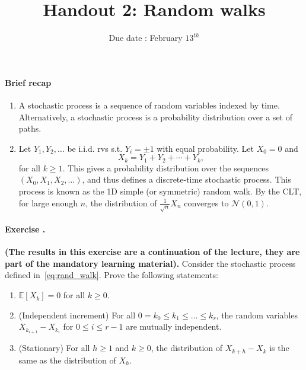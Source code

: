 \documentclass[twocolumn,12pt,a4paper]{article}
\title{ \bfseries \Huge {Handout 2: Random walks }}
\date{Due date : February $13^{th}$}
\newcommand{\calN}{\mathcal N}
\newcounter{num}  %
\begin{document}
	\maketitle
	\setcounter{num}{1}  %
	
	\thispagestyle{empty} 
	\paragraph{Brief recap}
	\begin{enumerate}
		\item A stochastic process is a sequence of random variables indexed by time.
		Alternatively, a stochastic process is a probability distribution over a set of paths.
	\item 	Let \( Y_1, Y_2, \dots \) be i.i.d. rvs s.t. \( Y_i = \pm 1 \) with equal probability. Let \( X_0 = 0 \) and
	\begin{equation}\label{eq:rand_walk}
		X_k = Y_1 + Y_2 + \cdots + Y_k,
	\end{equation}
	for all \( k \geq 1 \). This gives a probability distribution over the sequences $( X_0, X_1, X_2, \dots)$, and thus defines a discrete-time stochastic process. This process is known as the 1D simple (or symmetric) random walk.
	By the CLT, for large enough $n$, the distribution of \( \frac{1}{\sqrt{n}} X_n \) converges to $\calN(0,1)$.
	
		\end{enumerate}


\paragraph{Exercise \thenum.}{\bfseries (The results in this exercise are a continuation of the lecture, they are part of the mandatory learning material).}
Consider the stochastic process defined in~\eqref{eq:rand_walk}.
Prove the following statements:
\begin{enumerate}
	\item \( \mathbb{E}[X_k] = 0 \) for all \( k\geq 0 \).
	\item (Independent increment) For all \( 0 = k_0 \leq k_1 \leq \dots \leq k_r \), the random variables \( X_{k_{i+1}} - X_{k_i} \) for \( 0 \leq i \leq r - 1 \) are mutually independent.
	\item (Stationary) For all \( h \geq 1 \) and \( k \geq 0 \), the distribution of \( X_{k+h} - X_k \) is the same as the distribution of \( X_h \).
\end{enumerate}
\end{document}
